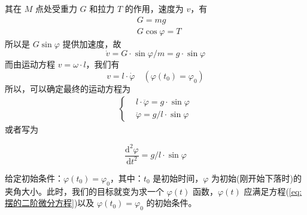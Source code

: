 		其在 $M$ 点处受重力 $G$ 和拉力 $T$ 的作用，速度为 $v$，有
		\begin{align*}
			&G = mg \\
			&G \cos{\varphi} = T
		\end{align*}
		所以是 $G\sin{\varphi}$ 提供加速度，故
		\[
			\dot{v} = G \cdot \sin{\varphi} / m = g \cdot \sin{\varphi}
		\]
		而由运动方程 $v = \omega \cdot l$，我们有
		\[
			v = l \cdot \dot{\varphi} \quad (\varphi(t_0) = \varphi_0)
		\]
		所以，可以确定最终的运动方程为
		\begin{align*}
			\left\{
				\begin{aligned}
				&l \cdot \ddot{\varphi} = g \cdot \sin{\varphi}\\
				&\ddot{\varphi} = g/l \cdot \sin{\varphi}
				\end{aligned}
			\right.
		\end{align*}
		或者写为
		\par
		\begin{equation}
			\frac{\mathrm{d}^2\varphi}{\mathrm{d}t^2} = g/l \cdot \sin{\varphi}
			\label{eq:摆的二阶微分方程}
		\end{equation}
		\par
		给定初始条件：$\varphi(t_0) = \varphi_0$，其中：$t_0$ 是初始时间，$\varphi$ 为初始(刚开始下落时)的夹角大小。此时，我们的目标就变为求一个 $\varphi(t)$ 函数，$\varphi(t)$ 应满足方程(\ref{eq:摆的二阶微分方程})以及 $\varphi(t_0) = \varphi_0$ 的初始条件。
